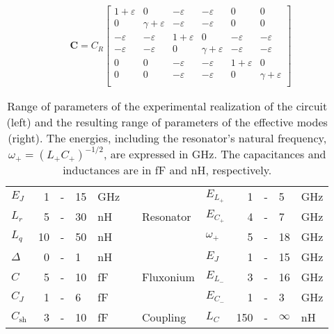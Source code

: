\usepackage{amsmath}

\begin{equation}
\mathbf{C}=C_R
    \begin{bmatrix}
    1+\varepsilon       & 0             & -\varepsilon        & -\varepsilon     & 0              & 0           \\
    0               & \gamma+\varepsilon     & -\varepsilon        & -\varepsilon     & 0              & 0           \\
    -\varepsilon          & -\varepsilon        & 1+\varepsilon     & 0          & -\varepsilon         & -\varepsilon      \\
    -\varepsilon          & -\varepsilon        & 0             & \gamma+\varepsilon  & -\varepsilon         & -\varepsilon      \\
    0               & 0             & -\varepsilon        & -\varepsilon     & 1+\varepsilon      & 0           \\
    0               & 0             & -\varepsilon        & -\varepsilon     &  0             & \gamma+\varepsilon   \\
    \end{bmatrix}
\end{equation}




\begin{table}[]
\centering
\renewcommand{\arraystretch}{1.25} %
\begin{tabular}{|l|rcll|l|l|l|rcll|}
\cline{1-5} \cline{7-12}
$E_J$         & 1  & - & 15 &  GHz & & \multirow{3}{*}{Resonator} & $E_{L_+}$                   & 1   & - & 5     & GHz  \\ \cline{1-5} \cline{8-12}
$L_r$         & 5  & - & 30 &  nH  & &                            & $E_{C_+}$                   & 4   & - & 7     & GHz  \\ \cline{1-5} \cline{8-12}
$L_q$         & 10 & - & 50 &  nH  & &                            & $\omega_+$                  & 5   & - & 18    & GHz  \\ \cline{1-5} \cline{7-12}
$\Delta$      & 0  & - & 1  &  nH  & & \multirow{3}{*}{Fluxonium} & $E_{J}$                     & 1   & - & 15    & GHz  \\ \cline{1-5} \cline{8-12}
$C$           & 5  & - & 10 &  fF  & &                            & $E_{L_-}$                   & 3   & - & 16    & GHz  \\ \cline{1-5} \cline{8-12}
$C_J$         & 1  & - & 6  &  fF  & &                            & $E_{C_-}$                   & 1   & - & 3     & GHz  \\ \cline{1-5} \cline{7-12}
$C_\text{sh}$ & 3  & - & 10 &  fF  & & Coupling                   & $L_C $               & 150 & - & $\infty$     & nH   \\ \cline{1-5} \cline{7-12}
\end{tabular}
\caption{Range of parameters of the experimental realization of the circuit (left) and the resulting range of parameters of the effective modes (right). The energies, including the resonator's natural frequency, $\omega_+ = (L_+C_+)^{-1/2}$, are expressed in GHz. The capacitances and inductances are in fF and nH, respectively. }
\label{table:exp_params}
\end{table}